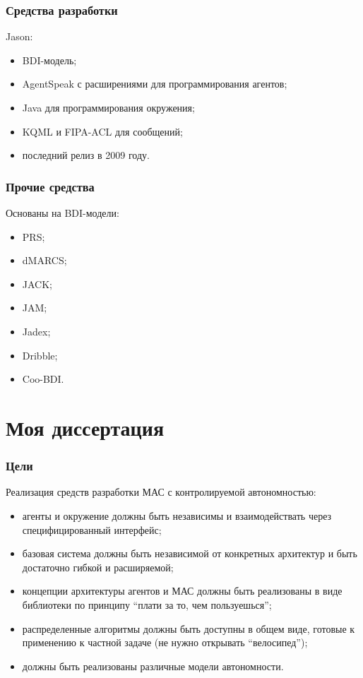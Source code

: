 \documentclass{beamer}
\begin{document}
\begin{frame}
  \frametitle{Средства разработки}
  Jason:
  \begin{itemize}
    \item BDI-модель;
    \item AgentSpeak с расширениями для программирования агентов;
    \item Java для программирования окружения;
    \item KQML и FIPA-ACL для сообщений;
    \item последний релиз в 2009 году.
  \end{itemize}
\end{frame}

\begin{frame}
  \frametitle{Прочие средства}
  Основаны на BDI-модели:
  \begin{itemize}
    \item PRS;
    \item dMARCS;
    \item JACK;
    \item JAM;
    \item Jadex;
    \item Dribble;
    \item Coo-BDI.
  \end{itemize}
\end{frame}

\section{Моя диссертация}

\begin{frame}
  \frametitle{Цели}
  Реализация средств разработки МАС с контролируемой автономностью:
  \begin{itemize}
    \item агенты и окружение должны быть независимы и взаимодействать через
      специфицированный интерфейс;
    \item базовая система должны быть независимой от конкретных архитектур и
      быть достаточно гибкой и расширяемой;
    \item концепции архитектуры агентов и МАС должны быть реализованы в виде библиотеки
      по принципу ``плати за то, чем пользуешься'';
    \item распределенные алгоритмы должны быть доступны в общем виде, готовые к применению
      к частной задаче (не нужно открывать ``велосипед'');
    \item должны быть реализованы различные модели автономности.
  \end{itemize}
\end{frame}
\end{document}
